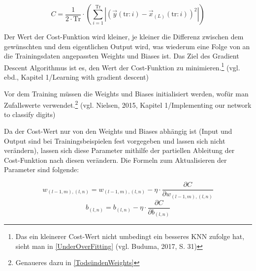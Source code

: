 \documentclass[a4paper,12pt,ngerman,oneside]{scrreprt}	%
\newcommand{\fundamentals}[1]{(vgl. Buduma, 2017, S. {#1})}
\begin{document}
			\begin{equation}\label{MSE}
				C = \frac{1}{2\cdot\textrm{Tr}} \cdot \left( \sum_{i=1}^{\textrm{Tr}} |(\vec{y}(\textrm{tr}:i) - \vec{x}_{(L)}(\textrm{tr}:i))^2| \right)
			\end{equation} %
			
			Der Wert der Cost-Funktion wird kleiner, je kleiner die Differenz zwischen dem gewünschten und dem eigentlichen Output wird, was wiederum eine Folge von an die Trainingsdaten angepassten Weights und Biases ist. Das Ziel des Gradient Descent Algorithmus ist es, den Wert der Cost-Funktion zu minimieren.\footnote{Das ein kleinerer Cost-Wert nicht umbedingt ein besseres KNN zufolge hat, sieht man in \ref{UnderOverFitting} \fundamentals{31}} (vgl. ebd., Kapitel 1/Learning with gradient descent) 
			
			Vor dem Training müssen die Weights und Biases initialisiert werden, wofür man Zufallswerte verwendet.\footnote{Genaueres dazu in \ref{TodsündenWeights}} (vgl. Nielsen, 2015, Kapitel 1/Implementing our network to classify digits) 
			
			Da der Cost-Wert nur von den Weights und Biases abhängig ist (Input und Output sind bei Trainingsbeispielen fest vorgegeben und lassen sich nicht verändern), lassen sich diese Parameter mithilfe der partiellen Ableitung der Cost-Funktion nach diesen verändern. Die Formeln zum Aktualisieren der Parameter sind folgende:
			
			\begin{equation}\label{UpdateRuleWeights}
				w_{(l-1,m),(l,n)} = w_{(l-1,m),(l,n)} - \eta \cdot \frac{\partial C}{\partial w_{(l-1,m),(l,n)}}
			\end{equation}
			\begin{equation}\label{UpdateRuleBiases}
				b_{(l,n)} = b_{(l,n)} - \eta \cdot \frac{\partial C}{\partial b_{(l,n)}}
			\end{equation}
			
\end{document}
